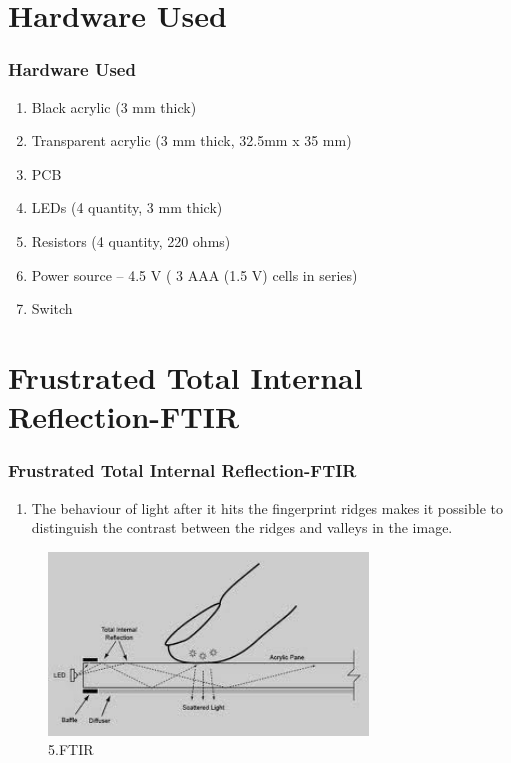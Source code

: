 \documentclass[12pt]{beamer}
\begin{document}
\section{Hardware Used}
\begin{frame}[c]
\frametitle{Hardware Used}
\begin{enumerate}
\item \vskip-20pt Black acrylic (3 mm thick)
\item Transparent acrylic (3 mm thick, 32.5mm x 35 mm)
\item PCB
\item LEDs (4 quantity, 3 mm thick)
\item Resistors (4 quantity, 220 ohms) 
\item Power source – 4.5 V ( 3 AAA (1.5 V) cells in series)
\item Switch
\end{enumerate}
\end{frame}



\section{Frustrated Total Internal Reflection-FTIR}
\begin{frame}[c]
\frametitle{Frustrated Total Internal Reflection-FTIR}
\begin{enumerate}
 \item The behaviour of light after it hits the fingerprint ridges makes it possible to distinguish the contrast between the ridges and valleys in the image.
\end{enumerate}
\begin{figure}
 \centering
 \includegraphics[width=8.5cm]{./ftir.jpg}
 \caption{5.FTIR}
\end{figure}
\end{frame}
\end{document}
